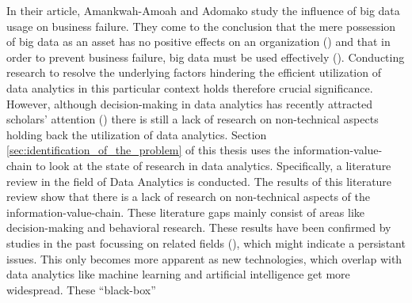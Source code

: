 
In their article, Amankwah-Amoah and Adomako study the influence of big data usage on business failure. 
They come to the conclusion that the mere possession of big data as an asset has no positive effects on an organization (\cite{AmankwahAmoah.2019}) and that in order to prevent business failure, big data must be used effectively (\cite{AmankwahAmoah.2019}). Conducting research to resolve the underlying factors hindering the efficient utilization of data analytics in this particular context holds therefore crucial significance. However, although decision-making in data analytics has recently attracted scholars' attention (\cite{Chen.2022}) there is still a lack of research on non-technical aspects holding back the utilization of data analytics. Section \ref{sec:identification_of_the_problem} of this thesis uses the information-value-chain to look at the state of research in data analytics. Specifically, a literature review in the field of Data Analytics is conducted. The results of this literature review show that there is a lack of research on non-technical aspects of the information-value-chain. These literature gaps mainly consist of areas like decision-making and behavioral research. These results have been confirmed by studies in the past focussing on related fields (\cite{Trieu.2017}), which might indicate a persistant issues. This only becomes more apparent as new technologies, which overlap with data analytics like machine learning and artificial intelligence get more widespread. These \enquote{black-box}%
